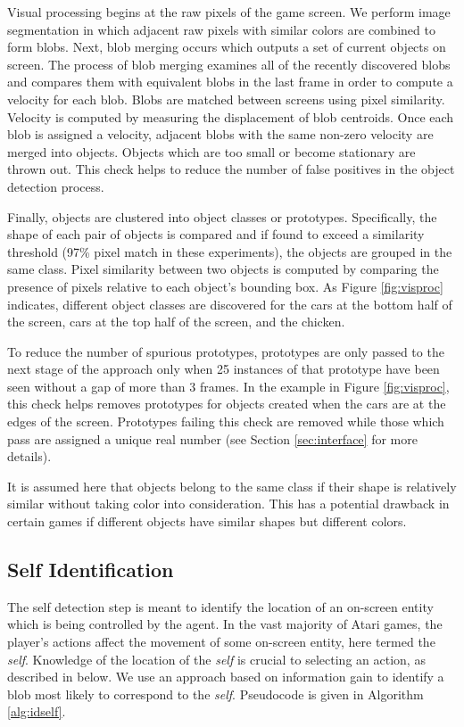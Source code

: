 \documentclass{acm_proc_article-sp}
\begin{document}
Visual processing begins at the raw pixels of the game screen. We perform image segmentation in which adjacent raw pixels with similar colors are combined to form blobs. Next, blob merging occurs which outputs a set of current objects on screen. The process of blob merging examines all of the recently discovered blobs and compares them with equivalent blobs in the last frame in order to compute a velocity for each blob. Blobs are matched between screens using pixel similarity. Velocity is computed by measuring the displacement of blob centroids. Once each blob is assigned a velocity, adjacent blobs with the same non-zero velocity are merged into objects. Objects which are too small or become stationary are thrown out. This check helps to reduce the number of false positives in the object detection process.

Finally, objects are clustered into object classes or prototypes. Specifically, the shape of each pair of objects is compared and if found to exceed a similarity threshold (97\% pixel match in these experiments), the objects are grouped in the same class. Pixel similarity between two objects is computed by comparing the presence of pixels relative to each object's bounding box. As Figure \ref{fig:visproc} indicates, different object classes are discovered for the cars at the bottom half of the screen, cars at the top half of the screen, and the chicken. 

To reduce the number of spurious prototypes, prototypes are only passed to the next stage of the approach only when 25 instances of that prototype have been seen without a gap of more than 3 frames. In the example in Figure \ref{fig:visproc}, this check helps removes prototypes for objects created when the cars are at the edges of the screen. Prototypes failing this check are removed while those which pass are assigned a unique real number (see Section \ref{sec:interface} for more details).

It is assumed here that objects belong to the same class if their shape is relatively similar without taking color into consideration. This has a potential drawback in certain games if different objects have similar shapes but different colors. 

\subsection{Self Identification}
The self detection step is meant to identify the location of an on-screen entity which is being controlled by the agent. In the vast majority of Atari games, the player's actions affect the movement of some on-screen entity, here termed the \textit{self}. Knowledge of the location of the \textit{self} is crucial to selecting an action, as described in below. We use an approach based on information gain to identify a blob most likely to correspond to the \textit{self}. Pseudocode is given in Algorithm \ref{alg:idself}.
\end{document}
